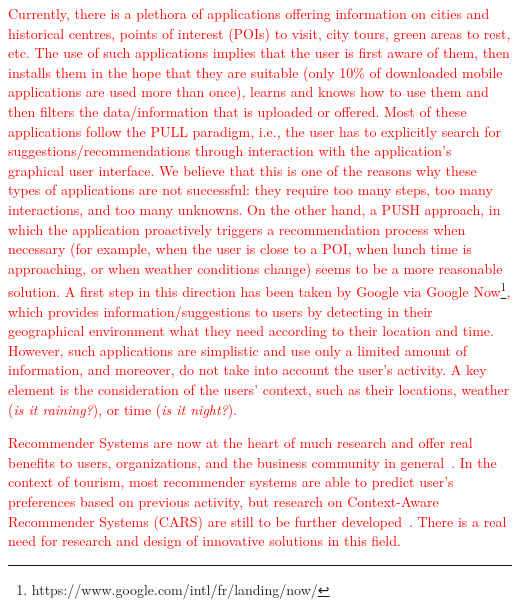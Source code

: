 
\textcolor{red}{Currently, there is a plethora of applications offering information on cities and historical centres, points of interest (POIs) to visit, city tours, green areas to rest, etc. The use of such applications implies that the user is first aware of them, then installs them in the hope that they are suitable (only 10\% of downloaded mobile applications are used more than once), learns and knows how
to use them and then filters the data/information that is uploaded or offered. Most of these
applications follow the PULL paradigm, i.e., the user has to explicitly search for
suggestions/recommendations through interaction with the application’s graphical user interface.
We believe that this is one of the reasons why these types of applications are not successful: they
require too many steps, too many interactions, and too many unknowns. On the other hand, a
PUSH approach, in which the application proactively triggers a recommendation process when
necessary (for example, when the user is close to a POI, when lunch time is approaching, or
when weather conditions change) seems to be a more reasonable solution. A first step in this
direction has been taken by Google via Google Now\footnote{https://www.google.com/intl/fr/landing/now/}, 
which provides information/suggestions
to users by detecting in their geographical environment what they need according to their
location and time. However, such applications are simplistic and use only a limited amount of
information, and moreover, do not take into account the user’s activity. A key element is the
consideration of the users' context, such as their locations, weather (\textit{is it raining?}), or time (\textit{is it night?}).}


\textcolor{red}{Recommender Systems are now at the heart of
much research and offer real benefits to users, organizations, and the business community in
general~\cite{borras2014intelligent,del2016pull,leskovec2020mining}. In the context of tourism, most recommender systems are able to predict user's preferences based on previous activity, but research on Context-Aware Recommender Systems
(CARS) are still to
be further developed~\cite{adomavicius2011context,nejma2015service,haruna2017context,raza2019progress}. There is a real need for research and design of innovative solutions in this field.
}



